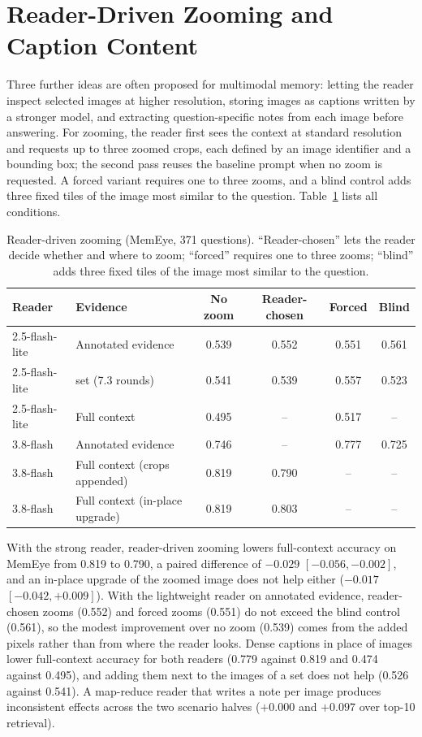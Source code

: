 \section{Reader-Driven Zooming and Caption Content}
\label{app:zoom}

Three further ideas are often proposed for multimodal memory: letting the reader inspect selected images at higher resolution, storing images as captions written by a stronger model, and extracting question-specific notes from each image before answering. For zooming, the reader first sees the context at standard resolution and requests up to three zoomed crops, each defined by an image identifier and a bounding box; the second pass reuses the baseline prompt when no zoom is requested. A forced variant requires one to three zooms, and a blind control adds three fixed tiles of the image most similar to the question. Table~\ref{tab:zoom} lists all conditions.

\begin{table}[h]
\centering
\caption{Reader-driven zooming (MemEye, 371 questions). ``Reader-chosen'' lets the reader decide whether and where to zoom; ``forced'' requires one to three zooms; ``blind'' adds three fixed tiles of the image most similar to the question.}
\label{tab:zoom}
\small
\begin{tabular}{llcccc}
\toprule
Reader & Evidence & No zoom & Reader-chosen & Forced & Blind \\
\midrule
2.5-flash-lite & Annotated evidence & 0.539 & 0.552 & 0.551 & 0.561 \\
2.5-flash-lite & \qss{} set (7.3 rounds) & 0.541 & 0.539 & 0.557 & 0.523 \\
2.5-flash-lite & Full context & 0.495 & -- & 0.517 & -- \\
3.8-flash & Annotated evidence & 0.746 & -- & 0.777 & 0.725 \\
3.8-flash & Full context (crops appended) & 0.819 & 0.790 & -- & -- \\
3.8-flash & Full context (in-place upgrade) & 0.819 & 0.803 & -- & -- \\
\bottomrule
\end{tabular}
\end{table}

With the strong reader, reader-driven zooming lowers full-context accuracy on MemEye from 0.819 to 0.790, a paired difference of $-0.029$ $[-0.056, -0.002]$, and an in-place upgrade of the zoomed image does not help either ($-0.017$ $[-0.042, +0.009]$). With the lightweight reader on annotated evidence, reader-chosen zooms (0.552) and forced zooms (0.551) do not exceed the blind control (0.561), so the modest improvement over no zoom (0.539) comes from the added pixels rather than from where the reader looks. Dense captions in place of images lower full-context accuracy for both readers (0.779 against 0.819 and 0.474 against 0.495), and adding them next to the images of a \qss{} set does not help (0.526 against 0.541). A map-reduce reader that writes a note per image produces inconsistent effects across the two scenario halves ($+0.000$ and $+0.097$ over top-10 retrieval).

